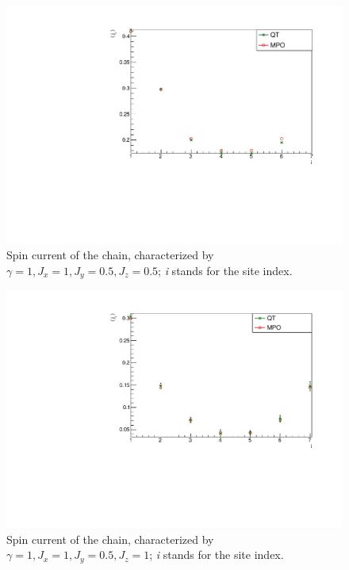 \begin{figure}[H]
    \centering
    \includegraphics[scale=0.7]{Figures/8sites/SpinCurr_8s_J10505.pdf}
    \caption{Spin current of the chain, characterized by $\gamma=1, J_x=1, J_y=0.5, J_z=0.5$; \emph{i} stands for the site index.}
    \label{fig:my_label}
\end{figure}

\begin{figure}[H]
    \centering
    \includegraphics[scale=0.7]{Figures/8sites/SpinCurr_8s_J1051.pdf}
    \caption{Spin current of the chain, characterized by $\gamma=1, J_x=1, J_y=0.5, J_z=1$; \emph{i} stands for the site index.}
    \label{fig:my_label}
\end{figure}

